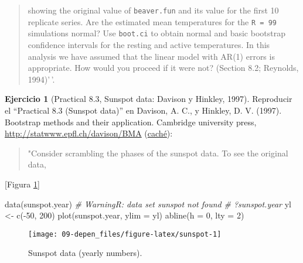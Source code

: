 \documentclass[
]{book}
\newenvironment{Shaded}{\begin{snugshade}}{\end{snugshade}}
\newcommand{\AttributeTok}[1]{\textcolor[rgb]{0.77,0.63,0.00}{#1}}
\newcommand{\CommentTok}[1]{\textcolor[rgb]{0.56,0.35,0.01}{\textit{#1}}}
\newcommand{\DecValTok}[1]{\textcolor[rgb]{0.00,0.00,0.81}{#1}}
\newcommand{\FunctionTok}[1]{\textcolor[rgb]{0.00,0.00,0.00}{#1}}
\newcommand{\NormalTok}[1]{#1}
\newcommand{\OtherTok}[1]{\textcolor[rgb]{0.56,0.35,0.01}{#1}}
\newcommand{\SpecialCharTok}[1]{\textcolor[rgb]{0.00,0.00,0.00}{#1}}
\theoremstyle{break}
\theoremstyle{definition}
\theoremstyle{definition}
\theoremstyle{definition}
\newtheorem{exercise}{Ejercicio}[chapter]
\theoremstyle{definition}
\theoremstyle{remark}
\begin{document}
\begin{quote}
showing the original value of \texttt{beaver.fun}
and its value for the first 10 replicate series.
Are the estimated mean temperatures for the \texttt{R\ =\ 99}
simulations normal?
Use \texttt{boot.ci} to obtain normal and basic bootstrap
confidence intervals for the resting and active temperatures.
In this analysis we have assumed that
the linear model with AR(1) errors is appropriate.
How would you proceed if it were not?
(Section 8.2; Reynolds, 1994)'\,'.
\end{quote}

\begin{exercise}[Practical 8.3, Sunspot data: Davison y Hinkley, 1997]
\protect\hypertarget{exr:tsboot-sunspot}{}{\label{exr:tsboot-sunspot} \iffalse (Practical 8.3, Sunspot data: Davison y Hinkley, 1997) \fi{} }
Reproducir el ``Practical 8.3 (Sunspot data)'' en Davison, A. C., y Hinkley, D. V. (1997). Bootstrap methods and their application. Cambridge university press, \url{http://statwww.epfl.ch/davison/BMA}
(\href{http://webcache.googleusercontent.com/search?q=cache:a4nFL5ymMMoJ:statwww.epfl.ch/davison/BMA/+\&cd=1\&hl=gl\&ct=clnk\&gl=es}{caché}):
\end{exercise}

\begin{quote}
"Consider scrambling the phases of the sunspot data.
To see the original data,
\end{quote}

{[}Figura \ref{fig:sunspot}{]}

\begin{Shaded}
\begin{Highlighting}[]
\FunctionTok{data}\NormalTok{(sunspot.year)  }\CommentTok{\# WarningR: data set \textquotesingle{}sunspot\textquotesingle{} not found}
\CommentTok{\# ?sunspot.year}
\NormalTok{yl }\OtherTok{\textless{}{-}} \FunctionTok{c}\NormalTok{(}\SpecialCharTok{{-}}\DecValTok{50}\NormalTok{, }\DecValTok{200}\NormalTok{)}
\FunctionTok{plot}\NormalTok{(sunspot.year, }\AttributeTok{ylim =}\NormalTok{ yl)}
\FunctionTok{abline}\NormalTok{(}\AttributeTok{h =} \DecValTok{0}\NormalTok{, }\AttributeTok{lty =} \DecValTok{2}\NormalTok{)}
\end{Highlighting}
\end{Shaded}

\begin{figure}[!htb]

{\centering \texttt{[image: 09-depen\_files/figure-latex/sunspot-1]} 

}

\caption{Sunspot data (yearly numbers).}\label{fig:sunspot}
\end{figure}
\end{document}

